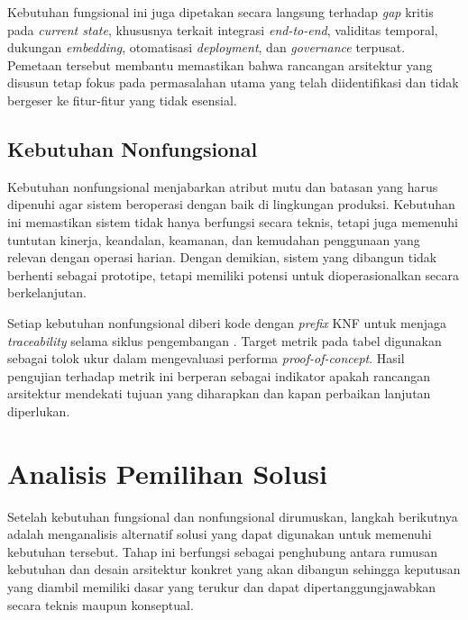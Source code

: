 Kebutuhan fungsional ini juga dipetakan secara langsung terhadap \textit{gap} kritis pada \textit{current state}, khususnya terkait integrasi \textit{end-to-end}, validitas temporal, dukungan \textit{embedding}, otomatisasi \textit{deployment}, dan \textit{governance} terpusat. Pemetaan tersebut membantu memastikan bahwa rancangan arsitektur yang disusun tetap fokus pada permasalahan utama yang telah diidentifikasi dan tidak bergeser ke fitur-fitur yang tidak esensial.



\vspace{-0.5cm}

\subsection{Kebutuhan Nonfungsional}

Kebutuhan nonfungsional menjabarkan atribut mutu dan batasan yang harus dipenuhi agar sistem beroperasi dengan baik di lingkungan produksi. Kebutuhan ini memastikan sistem tidak hanya berfungsi secara teknis, tetapi juga memenuhi tuntutan kinerja, keandalan, keamanan, dan kemudahan penggunaan yang relevan dengan operasi harian. Dengan demikian, sistem yang dibangun tidak berhenti sebagai prototipe, tetapi memiliki potensi untuk dioperasionalkan secara berkelanjutan.

Setiap kebutuhan nonfungsional diberi kode dengan \textit{prefix} KNF untuk menjaga \textit{traceability} selama siklus pengembangan \autocite{sommerville2016software,lamsweerde2009requirements}. Target metrik pada tabel digunakan sebagai tolok ukur dalam mengevaluasi performa \textit{proof-of-concept}. Hasil pengujian terhadap metrik ini berperan sebagai indikator apakah rancangan arsitektur mendekati tujuan yang diharapkan dan kapan perbaikan lanjutan diperlukan.



\vspace{-0.5cm}

\section{Analisis Pemilihan Solusi}

Setelah kebutuhan fungsional dan nonfungsional dirumuskan, langkah berikutnya adalah menganalisis alternatif solusi yang dapat digunakan untuk memenuhi kebutuhan tersebut. Tahap ini berfungsi sebagai penghubung antara rumusan kebutuhan dan desain arsitektur konkret yang akan dibangun sehingga keputusan yang diambil memiliki dasar yang terukur dan dapat dipertanggungjawabkan secara teknis maupun konseptual.

